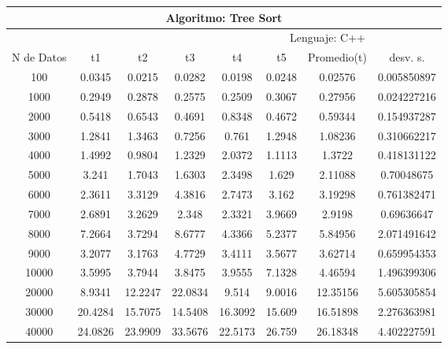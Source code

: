 \documentclass{article}
\begin{document}
    \begin{table}[]
        \begin{tabular}{|c|c|c|c|c|c|c|c| }
            \hline
            \multicolumn{8}{|c|}{Algoritmo: Tree Sort} \\ \hline
            \multicolumn{4}{|c|}{} & \multicolumn{4}{c|}{Lenguaje: C++} \\ \hline
              N de Datos &     t1    &  t2         &  t3          &   t4        &    t5     &   Promedio(t)       & desv. s. \\ \hline
            100   & 0.0345  &   0.0215  &   0.0282   &  0.0198   & 0.0248  & 0.02576  & 0.005850897 \\ \hline
            1000   & 0.2949  &	0.2878  &	0.2575   &	0.2509   & 0.3067  & 0.27956  & 0.024227216 \\ \hline
            2000   & 0.5418  &	0.6543  &	0.4691   &	0.8348   & 0.4672  & 0.59344  & 0.154937287 \\ \hline
            3000   & 1.2841  &	1.3463  &	0.7256   &	0.761    & 1.2948  & 1.08236  & 0.310662217 \\ \hline
            4000   & 1.4992  &	0.9804  &	1.2329   &	2.0372   & 1.1113  & 1.3722   & 0.418131122 \\ \hline
            5000   & 3.241   &   1.7043  &	1.6303   &	2.3498   & 1.629   & 2.11088  & 0.70048675  \\ \hline
            6000   & 2.3611  &	3.3129  &	4.3816	 &  2.7473   & 3.162   & 3.19298  & 0.761382471 \\ \hline
            7000   & 2.6891  &	3.2629  &	2.348	 &  2.3321   & 3.9669  & 2.9198   & 0.69636647  \\ \hline
            8000   & 7.2664  &	3.7294  &	8.6777   &	4.3366   & 5.2377  & 5.84956  & 2.071491642 \\ \hline
            9000   & 3.2077  &	3.1763  &	4.7729   &	3.4111   & 3.5677  & 3.62714  & 0.659954353 \\ \hline
            10000   & 3.5995  &	3.7944  &	3.8475   &	3.9555   & 7.1328  & 4.46594  & 1.496399306 \\ \hline
            20000   & 8.9341  &	12.2247 &	22.0834  &  9.514    & 9.0016  & 12.35156 & 5.605305854 \\ \hline
            30000   & 20.4284 &	15.7075 &   14.5408  &  16.3092  & 15.609  & 16.51898 & 2.276363981 \\ \hline
            40000   & 24.0826	&   23.9909 &	33.5676  &  22.5173  & 26.759  & 26.18348 & 4.402227591 \\ \hline

\end{tabular}
\end{table}
\end{document}
